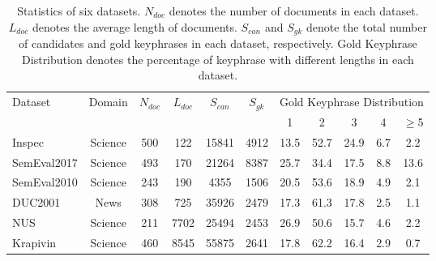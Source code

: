 \documentclass[11pt]{article}
\begin{document}
\begin{table*}
\centering
{}
\begin{tabular}{lcccccccccc} 
\toprule
\multirow{2}{*}{Dataset} & \multirow{2}{*}{Domain} & \multirow{2}{*}{$N_{doc}$} & \multirow{2}{*}{$L_{doc}$} & \multirow{2}{*}{$S_{can}$} & \multirow{2}{*}{$S_{gk}$} & \multicolumn{5}{c}{Gold Keyphrase Distribution}  \\ 
\cmidrule{7-11}
                         &                    &                    &                         &                    &                    & 1    & 2    & 3    & 4   & $\geq$5                     \\ 
\midrule
Inspec                   & Science            & 500                & 122                     & 15841              & 4912               & 13.5 & 52.7 & 24.9 & 6.7 & 2.2                   \\
SemEval2017              & Science            & 493                & 170                     & 21264              & 8387               & 25.7 & 34.4 & 17.5 & 8.8 & 13.6                  \\
SemEval2010              & Science            & 243                & 190                     & 4355               & 1506               & 20.5 & 53.6 & 18.9 & 4.9 & 2.1                   \\
DUC2001                  & News               & 308                & 725                     & 35926              & 2479               & 17.3 & 61.3 & 17.8 & 2.5 & 1.1                   \\
NUS                      & Science            & 211                & 7702                    & 25494              & 2453               & 26.9 & 50.6 & 15.7 & 4.6 & 2.2                   \\
Krapivin                 & Science            & 460                & 8545                    & 55875              & 2641               & 17.8 & 62.2 & 16.4 & 2.9 & 0.7                   \\
\bottomrule
\end{tabular}
\caption{Statistics of six datasets. $N_{doc}$ denotes the number of documents in each dataset. $L_{doc}$ denotes the average length of documents. $S_{can}$ and $S_{gk}$ denote the total number of candidates and gold keyphrases in each dataset, respectively. Gold Keyphrase Distribution denotes the percentage of keyphrase with different lengths in each dataset.} 
\label{tb: dataset}
\end{table*}
\end{document}
